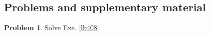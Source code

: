 \documentclass[12pt,b5paper,notitlepage]{article}
\theoremstyle{definition}
\newtheorem{prob}{\color{red}Problem}[section]
\theoremstyle{plain}
\numberwithin{equation}{section}
\begin{document}
\hypertarget{beforeindex}{}



\subsection{Problems and supplementary material}


\begin{prob}
Solve Exe. \ref{lb408}.
\end{prob}







































\newpage

\printindex	
\end{document}
